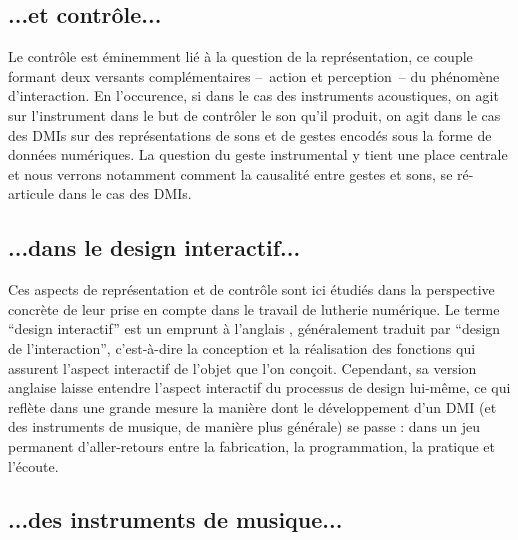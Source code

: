 \subsection{...et contrôle...}

\noindent Le contrôle est éminemment lié à la question de la représentation, ce couple formant deux versants complémentaires --~action et perception~-- du phénomène d'interaction. En l'occurence, si dans le cas des instruments acoustiques, on agit sur l'instrument dans le but de contrôler le son qu'il produit, on agit dans le cas des \glspl{DMI} sur des représentations de sons et de gestes encodés sous la forme de données numériques. La question du geste instrumental y tient une place centrale et nous verrons notamment comment la causalité entre gestes et sons, se ré-articule dans le cas des \glspl{DMI}.

\subsection{...dans le design interactif...}

\noindent Ces aspects de représentation et de contrôle sont ici étudiés dans la perspective concrète de leur prise en compte dans le travail de lutherie numérique. Le terme ``design interactif'' est un emprunt à l'anglais , généralement traduit par ``design de l'interaction'', c'est-à-dire la conception et la réalisation des fonctions qui assurent l'aspect interactif de l'objet que l'on conçoit. Cependant, sa version anglaise laisse entendre l'aspect interactif du processus de design lui-même, ce qui reflète dans une grande mesure la manière dont le développement d'un \gls{DMI} (et des instruments de musique, de manière plus générale) se passe : dans un jeu permanent d'aller-retours entre la fabrication, la programmation, la pratique et l'écoute.

\subsection{...des instruments de musique...}

